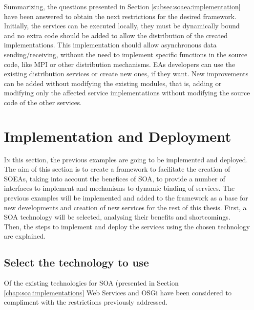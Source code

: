 Summarizing, the questions presented in Section \ref{subsec:soaea:implementation} have been answered to obtain the next restrictions for the desired framework. Initially, the services can be executed locally, they must be dynamically bound and no extra code should be added to allow the distribution of the created implementations. This implementation should allow asynchronous data sending/receiving, without the need to implement
  specific functions in the source code, like MPI or other
  distribution mechanisms. EAs developers can use the existing
  distribution services or create new ones, if they want. New improvements can be added
  without modifying the existing modules, that is, adding or modifying
  only the affected service implementations without modifying the
  source code of the other services.

\section{Implementation and Deployment}

\lettrine{I}{n} this section, the previous examples are going to be implemented and deployed. The aim of this section is to create a framework to facilitate the creation of SOEAs, taking into account the benefices of SOA, to provide a number of interfaces to implement and mechanisms to dynamic binding of services. The previous examples will be implemented and added to the framework as a base for new developments and creation of new services for the rest of this thesis. First, a SOA technology will be selected, analysing their benefits and shortcomings. Then, the steps to implement and deploy the services using the chosen technology are explained.

\subsection{Select the technology to use}
\label{sec:osgiliath:technology}

Of the existing technologies for SOA (presented in Section \ref{chap:soa:implementations} Web Services and OSGi have been considered to compliment with the restrictions previously addressed.

